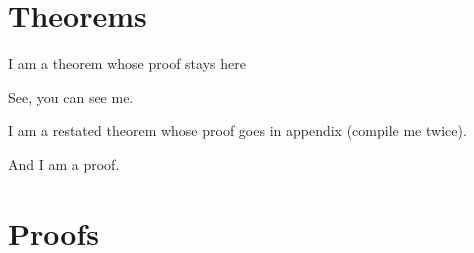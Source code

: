 \documentclass{article}
\begin{document}
\section{Theorems}

\begin{thmE}[My title]
  I am a theorem whose proof stays here
\end{thmE}
\begin{proofE}
  See, you can see me.
\end{proofE}

\begin{thmE}
  I am a restated theorem whose proof goes in appendix (compile me twice).
\end{thmE}
\begin{proofE}
  And I am a proof.
\end{proofE}

\section{Proofs}
\printProofs
\end{document}
